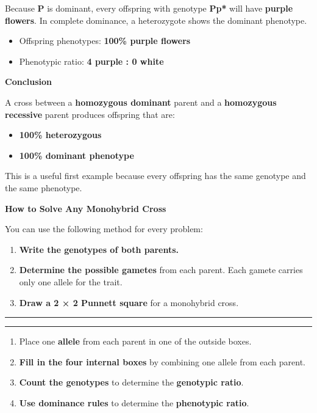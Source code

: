 \documentclass[
  letterpaper,
  DIV=11,
  numbers=noendperiod]{scrreprt}
\begin{document}
Because \textbf{P} is dominant, every offspring with genotype
\textbf{Pp*} will have \textbf{purple flowers}. In complete dominance, a
heterozygote shows the dominant phenotype.

\begin{itemize}
\item
  Offspring phenotypes: \textbf{100\% purple flowers}
\item
  Phenotypic ratio: \textbf{4 purple : 0 white}
\end{itemize}

\textbf{Conclusion}

A cross between a \textbf{homozygous dominant} parent and a
\textbf{homozygous recessive} parent produces offspring that are:

\begin{itemize}
\item
  \textbf{100\% heterozygous}
\item
  \textbf{100\% dominant phenotype}
\end{itemize}

This is a useful first example because every offspring has the same
genotype and the same phenotype.

\textbf{How to Solve Any Monohybrid Cross}

You can use the following method for every problem:

\begin{enumerate}
\def\labelenumi{\arabic{enumi}.}
\item
  \textbf{Write the genotypes of both parents.}
\item
  \textbf{Determine the possible gametes} from each parent. Each gamete
  carries only one allele for the trait.
\item
  \textbf{Draw a 2 × 2 Punnett square} for a monohybrid cross.
\end{enumerate}

\begin{center}\rule{0.5\linewidth}{0.5pt}\end{center}

\begin{center}\rule{0.5\linewidth}{0.5pt}\end{center}

\begin{enumerate}
\def\labelenumi{\arabic{enumi}.}
\setcounter{enumi}{3}
\item
  Place one \textbf{allele} from each parent in one of the outside
  boxes.
\item
  \textbf{Fill in the four internal boxes} by combining one allele from
  each parent.
\item
  \textbf{Count the genotypes} to determine the \textbf{genotypic
  ratio}.
\item
  \textbf{Use dominance rules} to determine the \textbf{phenotypic
  ratio}.
\end{enumerate}
\end{document}
